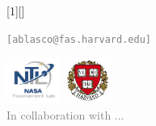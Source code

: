 \usepackage{fourier}
\usepackage{amsmath,amssymb}
\usepackage{graphicx,color,tikz}

\newcommand{\columnsbegin}{\begin{columns}}
\newcommand{\columnsend}{\end{columns}}




[1][]
{ 
\begin{center}
	\quad

	\vspace{1em}
	\footnotesize\textcolor{gray}{\insertauthor \texttt{[ablasco@fas.harvard.edu]}}
	\vspace{.5em}
	
	\includegraphics[height=1.5cm]{img/ntl-logo.png} \quad
	\includegraphics[height=1.5cm]{img/harvard-logo.png}\\
   \footnotesize\textcolor{gray}{In collaboration with  ... }\\
   \normalsize\textcolor{black!50!red}{\insertdate}
\end{center}
}

